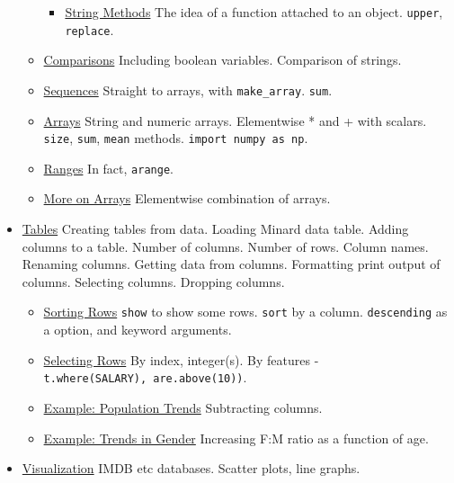 \begin{itemize}
\begin{itemize}
    \begin{itemize}
    \tightlist
    \item
      \href{chapters/04/1/1/string-methods.md}{String Methods} The idea
      of a function attached to an object. \texttt{upper},
      \texttt{replace}.
    \end{itemize}
  \item
    \href{chapters/04/2/comparisons.md}{Comparisons} Including boolean
    variables. Comparison of strings.
  \item
    \href{chapters/04/3/sequences.md}{Sequences} Straight to arrays,
    with \texttt{make\_array}. \texttt{sum}.
  \item
    \href{chapters/04/4/arrays.md}{Arrays} String and numeric arrays.
    Elementwise * and + with scalars. \texttt{size}, \texttt{sum},
    \texttt{mean} methods. \texttt{import\ numpy\ as\ np}.
  \item
    \href{chapters/04/5/ranges.md}{Ranges} In fact, \texttt{arange}.
  \item
    \href{chapters/04/6/more-on-arrays.md}{More on Arrays} Elementwise
    combination of arrays.
  \end{itemize}
\item
  \href{chapters/05/tables.md}{Tables} Creating tables from data.
  Loading Minard data table. Adding columns to a table. Number of
  columns. Number of rows. Column names. Renaming columns. Getting data
  from columns. Formatting print output of columns. Selecting columns.
  Dropping columns.

  \begin{itemize}
  \tightlist
  \item
    \href{chapters/05/1/sorting-rows.md}{Sorting Rows} \texttt{show} to
    show some rows. \texttt{sort} by a column. \texttt{descending} as a
    option, and keyword arguments.
  \item
    \href{chapters/05/2/selecting-rows.md}{Selecting Rows} By index,
    integer(s). By features -
    \texttt{t.where(\textquotesingle{}SALARY\textquotesingle{}),\ are.above(10))}.
  \item
    \href{chapters/05/3/example-trends-in-the-population-of-the-united-states.md}{Example:
    Population Trends} Subtracting columns.
  \item
    \href{chapters/05/4/example-gender-ratio-in-the-us-population.md}{Example:
    Trends in Gender} Increasing F:M ratio as a function of age.
  \end{itemize}
\item
  \href{chapters/06/visualization.md}{Visualization} IMDB etc databases.
  Scatter plots, line graphs.


\end{itemize}
